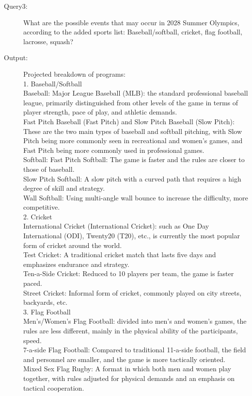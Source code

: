\documentclass{mcmthesis}
\begin{document}
\begin{enumerate}
\begin{description}
\item[Query3:] What are the possible events that may occur in 2028 Summer Olympics, according to the added sports list: Baseball/softball, cricket, flag football, lacrosse, squash?
\item[Output:]Projected breakdown of programs:\\
1. Baseball/Softball\\
Baseball: Major League Baseball (MLB): the standard professional baseball league, primarily distinguished from other levels of the game in terms of player strength, pace of play, and athletic demands.\\
Fast Pitch Baseball (Fast Pitch) and Slow Pitch Baseball (Slow Pitch): These are the two main types of baseball and softball pitching, with Slow Pitch being more commonly seen in recreational and women's games, and Fast Pitch being more commonly used in professional games.\\
Softball: Fast Pitch Softball: The game is faster and the rules are closer to those of baseball.\\
Slow Pitch Softball: A slow pitch with a curved path that requires a high degree of skill and strategy.\\
Wall Softball: Using multi-angle wall bounce to increase the difficulty, more competitive.\\
2. Cricket\\
International Cricket (International Cricket): such as One Day International (ODI), Twenty20 (T20), etc., is currently the most popular form of cricket around the world.\\
Test Cricket: A traditional cricket match that lasts five days and emphasizes endurance and strategy.\\
Ten-a-Side Cricket: Reduced to 10 players per team, the game is faster paced.\\
Street Cricket: Informal form of cricket, commonly played on city streets, backyards, etc.\\
3. Flag Football\\
Men's/Women's Flag Football: divided into men's and women's games, the rules are less different, mainly in the physical ability of the participants, speed.\\
7-a-side Flag Football: Compared to traditional 11-a-side football, the field and personnel are smaller, and the game is more tactically oriented.\\
Mixed Sex Flag Rugby: A format in which both men and women play together, with rules adjusted for physical demands and an emphasis on tactical cooperation.\\

\end{description}
\end{enumerate}
\end{document}
